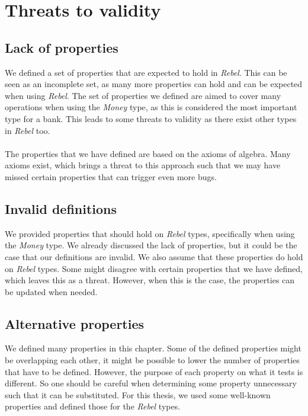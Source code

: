 \section{Threats to validity}
\subsection*{Lack of properties}
We defined a set of properties that are expected to hold in \textit{Rebel}.
This can be seen as an incomplete set, as many more properties can hold and can
be expected when using \textit{Rebel}. The set of properties we defined are
aimed to cover many operations when using the \textit{Money} type, as this is
considered the most important type for a bank. This leads to some threats to
validity as there exist other types in \textit{Rebel} too.\\
\\
The properties that we have defined are based on the axioms of algebra. Many
axioms exist, which brings a threat to this approach such that we may have
missed certain properties that can trigger even more bugs.

\subsection*{Invalid definitions}
We provided properties that should hold on \textit{Rebel} types, specifically
when using the \textit{Money} type. We already discussed the lack of properties,
but it could be the case that our definitions are invalid. We also assume that
these properties do hold on \textit{Rebel} types. Some might disagree with
certain properties that we have defined, which leaves this as a threat. However,
when this is the case, the properties can be updated when needed.

\subsection*{Alternative properties}
We defined many properties in this chapter. Some of the defined properties
might be overlapping each other, it might be possible to lower the number of
properties that have to be defined. However, the purpose of each property on
what it tests is different. So one should be careful when determining some
property unnecessary such that it can be substituted. For this thesis, we used
some well-known properties and defined those for the \textit{Rebel} types.
